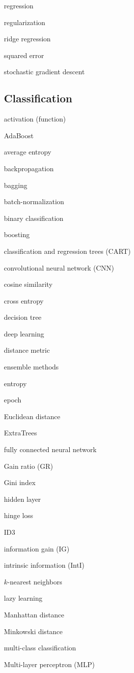 \documentclass[12pt]{article}
\newcommand{\mn}[1]{\marginnote{\tiny #1}}
\begin{document}
\begin{multicols*}{2}
{\mn{R}
regression

regularization

ridge regression

\mn{S}
squared error

stochastic gradient descent
}


\subsection*{Classification}

\mn{A}
activation (function)

AdaBoost

average entropy

\mn{B}
backpropagation

bagging

batch-normalization

binary classification

boosting

\mn{C}
classification and regression trees (CART)

convolutional neural network (CNN)

cosine similarity

cross entropy

\mn{D}
decision tree

deep learning

distance metric

\mn{E}
ensemble methods

entropy

epoch

Euclidean distance

ExtraTrees

\mn{F}
fully connected neural network

\mn{G}
Gain ratio (GR)

Gini index

\mn{H}
hidden layer

hinge loss

{\reversemarginpar
\mn{I}
ID3

information gain (IG)

intrinsic information (IntI)

\mn{K}
$k$-nearest neighbors

\mn{L}
lazy learning

\mn{M}
Manhattan distance

Minkowski distance

multi-class classification

Multi-layer perceptron (MLP)

}
\end{multicols*}
\end{document}
